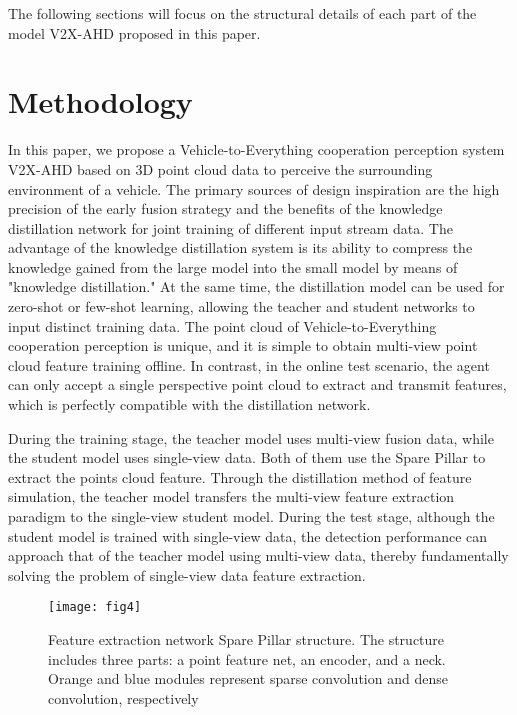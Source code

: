 \documentclass[lettersize,journal]{IEEEtran}
\begin{document}
The following sections will focus on the structural details of each part of the model V2X-AHD proposed in this paper.


\section{Methodology}



In this paper, we propose a Vehicle-to-Everything cooperation perception system V2X-AHD based on 3D point cloud data to perceive the surrounding environment of a vehicle. The primary sources of design inspiration are the high precision of the early fusion strategy and the benefits of the knowledge distillation network for joint training of different input stream data. The advantage of the knowledge distillation system is its ability to compress the knowledge gained from the large model into the small model by means of "knowledge distillation." At the same time, the distillation model can be used for zero-shot or few-shot learning, allowing the teacher and student networks to input distinct training data. The point cloud of Vehicle-to-Everything cooperation perception is unique, and it is simple to obtain multi-view point cloud feature training offline. In contrast, in the online test scenario, the agent can only accept a single perspective point cloud to extract and transmit features, which is perfectly compatible with the distillation network.

During the training stage, the teacher model uses multi-view fusion data, while the student model uses single-view data. Both of them use the Spare Pillar to extract the points cloud feature. Through the distillation method of feature simulation, the teacher model transfers the multi-view feature extraction paradigm to the single-view student model. During the test stage, although the student model is trained with single-view data, the detection performance can approach that of the teacher model using multi-view data, thereby fundamentally solving the problem of single-view data feature extraction.



\begin{figure*}[!t]
\centering
\texttt{[image: fig4]}
\caption{Feature extraction network Spare Pillar structure. The structure includes three parts: a point feature net, an encoder, and a neck. Orange and blue modules represent sparse convolution and dense convolution, respectively}
\label{fig_4}
\end{figure*}
\end{document}
